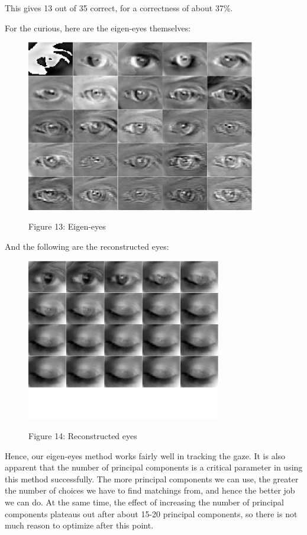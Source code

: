 \documentclass[12pt,letterpaper]{article}
\begin{document}
This gives 13 out of 35 correct, for a correctness of about 37\%.

\newpage For the curious, here are the eigen-eyes themselves:
\begin{figure}[h]
\centering
\includegraphics[width=10cm]{eigenEyes.png}

\small Figure 13: Eigen-eyes
\end{figure}

And the following are the reconstructed eyes:

\begin{figure}[h]
\centering
\includegraphics[width=8.5cm]{reconEye.png}

\small Figure 14: Reconstructed eyes
\end{figure}

Hence, our eigen-eyes method works fairly well in tracking the gaze. It is also apparent that the number
of principal components is a critical parameter in using this method successfully. The more principal
components we can use, the greater the number of choices we have to find matchings from, and hence the 
better job we can do. At the same time, the effect of increasing the number of principal components 
plateaus out after about 15-20 principal components, so there is not much reason to optimize after this 
point.
\end{document}
